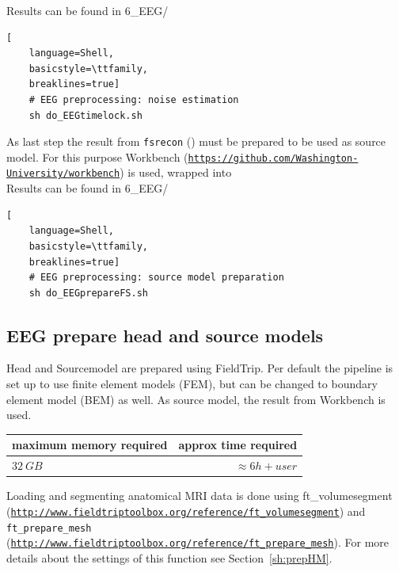 \documentclass[12pt,a4paper]{scrartcl}
\begin{document}
\noindent Results can be found in 6\_EEG/\\
\begin{lstlisting}[
    language=Shell,
    basicstyle=\ttfamily,
    breaklines=true]
    # EEG preprocessing: noise estimation
    sh do_EEGtimelock.sh
\end{lstlisting}
As last step the result from \texttt{fsrecon} (\texttt{}) must be prepared to be used as source model. For this purpose Workbench (\href{https://github.com/Washington-University/workbench}{\nolinkurl{https://github.com/Washington-University/workbench}}) is used, wrapped into \texttt{}\\

\noindent Results can be found in 6\_EEG/\\
\begin{lstlisting}[
    language=Shell,
    basicstyle=\ttfamily,
    breaklines=true]
    # EEG preprocessing: source model preparation
    sh do_EEGprepareFS.sh
\end{lstlisting}


\subsection{EEG prepare head and source models}
Head and Sourcemodel are prepared using FieldTrip. Per default the pipeline is set up to use finite element models (FEM), but can be changed to boundary element model (BEM) as well. As source model, the result from Workbench is used.
\label{sec:Sourcemodel}
\begin{table}[h]
\begin{tabular}{l | r}
\toprule
maximum memory required & approx time required\\\toprule
$32~GB$ & $\approx 6h+user$ \\\bottomrule
\end{tabular}
\end{table}
Loading and segmenting anatomical MRI data is done using ft\_volumesegment (\href{http://www.fieldtriptoolbox.org/reference/ft\_volumesegment}{\nolinkurl{http://www.fieldtriptoolbox.org/reference/ft\_volumesegment}}) and \texttt{ft\_prepare\_mesh} (\href{http://www.fieldtriptoolbox.org/reference/ft\_prepare\_mesh}{\nolinkurl{http://www.fieldtriptoolbox.org/reference/ft\_prepare\_mesh}}). For more details about the settings of this function see Section~\ref{sh:prepHM}.\\
\end{document}
